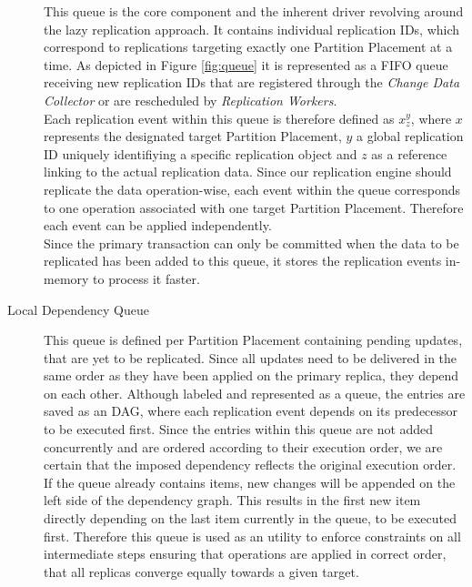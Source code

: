 \begin{description}
    This queue is the core component and the inherent driver revolving around the lazy replication approach. 
    It contains individual replication IDs, which correspond to replications targeting exactly one Partition Placement at a time.
    As depicted in Figure \ref{fig:queue} it is represented as a FIFO queue receiving new replication IDs that are registered through the \emph{Change Data Collector} 
    or are rescheduled by \emph{Replication Workers}.\\
    Each replication event within this queue is therefore defined as $x_{z}^y$, where $x$ represents the designated target Partition Placement, $y$ a global
    replication ID uniquely identifiying a specific replication object and $z$ as a reference linking to the actual replication data. 
    Since our replication engine should replicate the data operation-wise, each event within the queue corresponds to one operation associated with one target Partition Placement.
    Therefore each event can be applied independently.\\Since the primary transaction can only be committed when the data to be replicated has been added to this queue,
    it stores the replication events in-memory to process it faster.

  
    \item[Local Dependency Queue] This queue is defined per Partition Placement containing pending updates, that are yet to be replicated. 
    Since all updates need to be delivered in the same order as they have been applied on the primary replica, they depend on each other. 
    Although labeled and represented as a queue, the entries are saved as an DAG, where each replication event depends on its predecessor to be executed first.
    Since the entries within this queue are not added concurrently and are ordered according to their execution order, we are certain that the imposed dependency
    reflects the original execution order. If the queue already contains items, new changes will be appended on the left side of the dependency graph. 
    This results in the first new item directly depending on the last item currently in the queue, to be executed first. 
    Therefore this queue is used as an utility to enforce constraints on all intermediate steps ensuring that operations are applied 
    in correct order, that all replicas converge equally towards a given target. 



\end{description}

